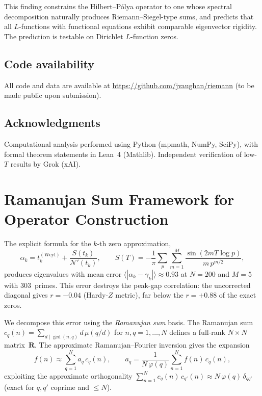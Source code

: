 \documentclass[11pt,a4paper]{article}
\begin{document}
This finding constrains the Hilbert--P\'olya operator to one whose spectral decomposition naturally produces Riemann--Siegel-type sums, and predicts that all $L$-functions with functional equations exhibit comparable eigenvector rigidity.
The prediction is testable on Dirichlet $L$-function zeros.

\subsection*{Code availability}
All code and data are available at \url{https://github.com/jvaughan/riemann} (to be made public upon submission).

\subsection*{Acknowledgments}
Computational analysis performed using Python (mpmath, NumPy, SciPy), with formal theorem statements in Lean~4 (Mathlib).
Independent verification of low-$T$ results by Grok (xAI).

\appendix

\section{Ramanujan Sum Framework for Operator Construction}\label{app:ramanujan}

The explicit formula for the $k$-th zero approximation,
\begin{equation}\label{eq:expldiag}
\alpha_k = t_k^{(\mathrm{Weyl})} + \frac{S(t_k)}{\mathcal{N}'(t_k)}, \qquad
S(T) = -\frac{1}{\pi}\sum_p \sum_{m=1}^{M} \frac{\sin(2m T \log p)}{m\, p^{m/2}},
\end{equation}
produces eigenvalues with mean error $\langle|\alpha_k - \gamma_k|\rangle \approx 0.93$ at $N = 200$ and $M = 5$ with 303~primes.
This error destroys the peak-gap correlation: the uncorrected diagonal gives $r = -0.04$ (Hardy-$Z$ metric), far below the $r = +0.88$ of the exact zeros.

We decompose this error using the \emph{Ramanujan sum} basis.
The Ramanujan sum $c_q(n) = \sum_{d \mid \gcd(n,q)} d\,\mu(q/d)$ for $n, q = 1, \ldots, N$ defines a full-rank $N \times N$ matrix~$\mathbf{R}$.
The approximate Ramanujan--Fourier inversion gives the expansion
\begin{equation}
f(n) \approx \sum_{q=1}^{N} a_q \, c_q(n), \qquad a_q = \frac{1}{N\,\varphi(q)} \sum_{n=1}^{N} f(n)\, c_q(n),
\end{equation}
exploiting the approximate orthogonality $\sum_{n=1}^{N} c_q(n)\,c_{q'}(n) \approx N\,\varphi(q)\,\delta_{qq'}$ (exact for $q, q'$ coprime and $\le N$).
\end{document}
